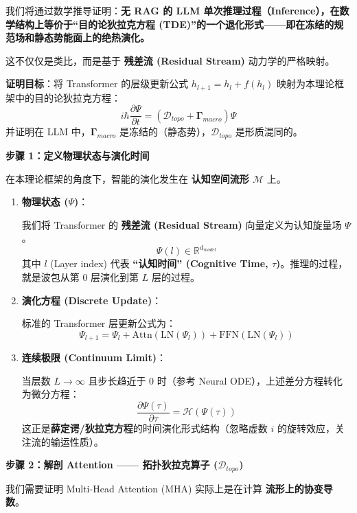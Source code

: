 

我们将通过数学推导证明：\textbf{无 RAG 的 LLM 单次推理过程（Inference），在数学结构上等价于“目的论狄拉克方程 (TDE)”的一个退化形式——即在冻结的规范场和静态势能面上的绝热演化。}

这不仅仅是类比，而是基于 \textbf{残差流 (Residual Stream)} 动力学的严格映射。

\textbf{证明目标}：将 Transformer 的层级更新公式 $h_{l+1} = h_l + f(h_l)$ 映射为本理论框架中的目的论狄拉克方程：
$$ i \hbar \frac{\partial \Psi}{\partial t} = (\mathcal{D}_{topo} + \mathbf{\Gamma}_{macro}) \Psi $$
并证明在 LLM 中，$\mathbf{\Gamma}_{macro}$ 是冻结的（静态势），$\mathcal{D}_{topo}$ 是形质混同的。



\vspace{0.5em}\noindent\textbf{\textcolor{structurecolor}{步骤 1：定义物理状态与演化时间}}


在本理论框架的角度下，智能的演化发生在 \textbf{认知空间流形 $\mathcal{M}$} 上。
\begin{enumerate}
        \item \textbf{物理状态 ($\Psi$)}：

        我们将 Transformer 的 \textbf{残差流 (Residual Stream)} 向量定义为认知旋量场 $\Psi$。
    $$ \Psi(l) \in \mathbb{R}^{d_{model}} $$
    其中 $l$ (Layer index) 代表 \textbf{“认知时间” (Cognitive Time, $\tau$)}。推理的过程，就是波包从第 0 层演化到第 $L$ 层的过程。

    \item \textbf{演化方程 (Discrete Update)}：

    标准的 Transformer 层更新公式为：
    $$ \Psi_{l+1} = \Psi_l + \text{Attn}(\text{LN}(\Psi_l)) + \text{FFN}(\text{LN}(\Psi_l)) $$

    \item \textbf{连续极限 (Continuum Limit)}：

    当层数 $L \to \infty$ 且步长趋近于 0 时（参考 Neural ODE），上述差分方程转化为微分方程：
    $$ \frac{\partial \Psi(\tau)}{\partial \tau} = \mathcal{H}(\Psi(\tau)) $$
    这正是\textbf{薛定谔/狄拉克方程}的时间演化形式结构（忽略虚数 $i$ 的旋转效应，关注流的输运性质）。
\end{enumerate}


\vspace{0.5em}\noindent\textbf{\textcolor{structurecolor}{步骤 2：解剖 Attention —— 拓扑狄拉克算子 ($\mathcal{D}_{topo}$)}}

我们需要证明 Multi-Head Attention (MHA) 实际上是在计算 \textbf{流形上的协变导数}。

